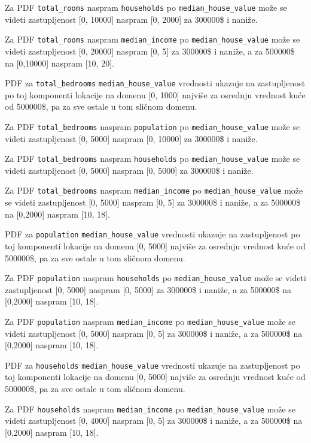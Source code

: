 \documentclass[fontsize=12bp, paper=a4]{scrarticle}
\begin{document}
Za PDF \verb*|total_rooms| naspram \verb*|households| po \verb|median_house_value| može se videti zastupljenost [0, 10000] naspram [0, 2000] za 300000\$ i naniže.

Za PDF \verb*|total_rooms| naspram \verb*|median_income| po \verb|median_house_value| može se videti zastupljenost [0, 20000] naspram [0, 5] za 300000\$ i naniže, a za 500000\$ na [0,10000] naspram [10, 20].

PDF za \verb*|total_bedrooms| \verb*|median_house_value| vrednosti ukazuje na zastupljenost po toj komponenti lokacije na domenu [0, 1000] najviše za osrednju vrednost kuće od 500000\$, pa za sve ostale u tom sličnom domenu.

Za PDF \verb*|total_bedrooms| naspram \verb*|population| po \verb|median_house_value| može se videti zastupljenost [0, 5000] naspram [0, 10000] za 300000\$ i naniže.

Za PDF \verb*|total_bedrooms| naspram \verb*|households| po \verb|median_house_value| može se videti zastupljenost [0, 5000] naspram [0, 5000] za 300000\$ i naniže.

Za PDF \verb*|total_bedrooms| naspram \verb*|median_income| po \verb|median_house_value| može se videti zastupljenost [0, 5000] naspram [0, 5] za 300000\$ i naniže, a za 500000\$ na [0,2000] naspram [10, 18].

PDF za \verb*|population| \verb*|median_house_value| vrednosti ukazuje na zastupljenost po toj komponenti lokacije na domenu [0, 5000] najviše za osrednju vrednost kuće od 500000\$, pa za sve ostale u tom sličnom domenu.

Za PDF \verb*|population| naspram \verb*|households| po \verb|median_house_value| može se videti zastupljenost [0, 5000] naspram [0, 5000] za 300000\$ i naniže, a za 500000\$ na [0,2000] naspram [10, 18].

Za PDF \verb*|population| naspram \verb*|median_income| po \verb|median_house_value| može se videti zastupljenost [0, 5000] naspram [0, 5] za 300000\$ i naniže, a za 500000\$ na [0,2000] naspram [10, 18].

PDF za \verb*|households| \verb*|median_house_value| vrednosti ukazuje na zastupljenost po toj komponenti lokacije na domenu [0, 5000] najviše za osrednju vrednost kuće od 500000\$, pa za sve ostale u tom sličnom domenu.

Za PDF \verb*|households| naspram \verb*|median_income| po \verb|median_house_value| može se videti zastupljenost [0, 4000] naspram [0, 5] za 300000\$ i naniže, a za 500000\$ na [0,2000] naspram [10, 18].
\end{document}
